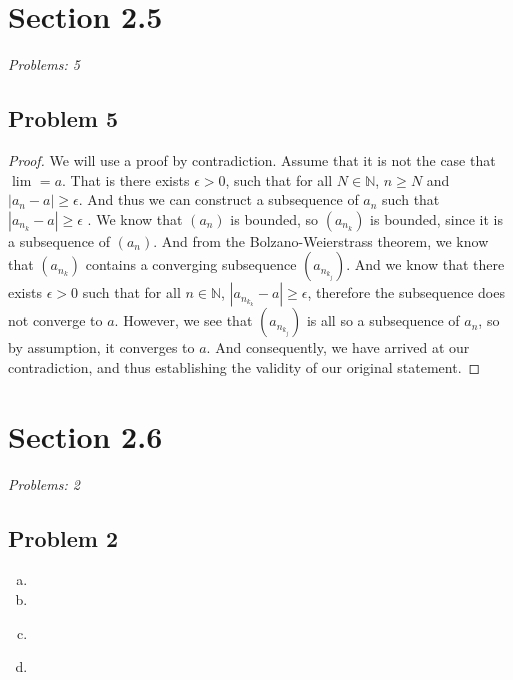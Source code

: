 \documentclass[12pt]{article}
\begin{document}

\section*{Section 2.5}
\textit{Problems: 5}
\subsection*{Problem 5}
\begin{proof}
    We will use a proof by contradiction. 
    Assume that it is not the case that $\lim_{} = a$. 
    That is there exists $\epsilon > 0$, such that for all $N \in \mathbb{N}$, $n \ge N$ and $|a_n - a| \ge \epsilon$. 
    And thus we can construct a subsequence of $a_n$ such that $|a_{n_k} - a| \ge \epsilon$ . 
    We know that $(a_n)$ is bounded, so $(a_{n_k})$ is bounded, since it is a subsequence of $(a_n)$. 
    And from the Bolzano-Weierstrass theorem, we know that $(a_{n_k})$ contains a converging subsequence $(a_{n_{k_j}})$. 
    And we know that there exists $\epsilon > 0$ such that for all $n \in \mathbb{N}$, $|a_{n_{k_{k}}} - a| \ge \epsilon$, therefore the subsequence does not converge to $a$. 
    However, we see that $(a_{n_{k_j}})$ is all so a subsequence of $a_n$, so by assumption, it converges to $a$. 
    And consequently, we have arrived at our contradiction, and thus establishing the validity of our original statement. 
\end{proof}


\vspace*{1cm}


\section*{Section 2.6}
\textit{Problems: 2}
\subsection*{Problem 2}
\begin{enumerate}[a).]
    \item {

    }
    \item {

    }
    \item {
    }
    \item {
    }
\end{enumerate}


\vspace*{1cm}
\end{document}
